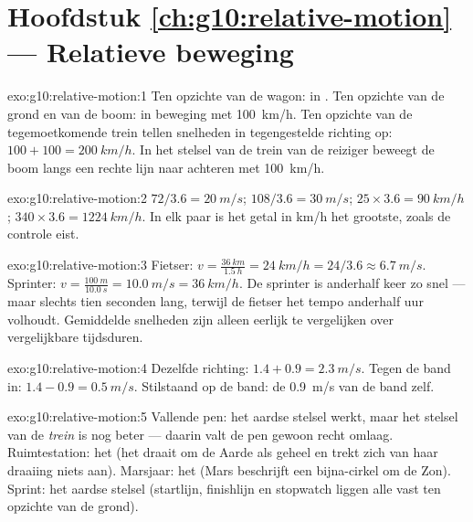 \section*{Hoofdstuk \ref{ch:g10:relative-motion} --- Relatieve beweging}

\begin{solution}{exo:g10:relative-motion:1}
Ten opzichte van de wagon: in . Ten opzichte van de grond en van de
boom: in beweging met \qty{100}{km/h}. Ten opzichte van de
tegemoetkomende trein tellen snelheden in tegengestelde richting op:
$100 + 100 = \qty{200}{km/h}$. In het stelsel van de trein van de
reiziger beweegt de boom langs een rechte lijn naar achteren met
\qty{100}{km/h}.
\end{solution}

\begin{solution}{exo:g10:relative-motion:2}
$72 / 3.6 = \qty{20}{m/s}$; $108 / 3.6 = \qty{30}{m/s}$;
$25 \times 3.6 = \qty{90}{km/h}$; $340 \times 3.6 = \qty{1224}{km/h}$.
In elk paar is het getal in \unit{km/h} het grootste, zoals de controle
eist.
\end{solution}

\begin{solution}{exo:g10:relative-motion:3}
Fietser: $v = \frac{\qty{36}{km}}{\qty{1.5}{h}} = \qty{24}{km/h}
= 24/3.6 \approx \qty{6.7}{m/s}$. Sprinter:
$v = \frac{\qty{100}{m}}{\qty{10.0}{s}} = \qty{10.0}{m/s}
= \qty{36}{km/h}$. De sprinter is anderhalf keer zo snel --- maar
slechts tien seconden lang, terwijl de fietser het tempo anderhalf uur
volhoudt. Gemiddelde snelheden zijn alleen eerlijk te vergelijken over
vergelijkbare tijdsduren.
\end{solution}

\begin{solution}{exo:g10:relative-motion:4}
Dezelfde richting: $1.4 + 0.9 = \qty{2.3}{m/s}$. Tegen de band in:
$1.4 - 0.9 = \qty{0.5}{m/s}$. Stilstaand op de band: de \qty{0.9}{m/s}
van de band zelf.
\end{solution}

\begin{solution}{exo:g10:relative-motion:5}
Vallende pen: het aardse stelsel werkt, maar het stelsel van de
\emph{trein} is nog beter --- daarin valt de pen gewoon recht omlaag.
Ruimtestation: het  (het draait om de Aarde als
geheel en trekt zich van haar draaiing niets aan). Marsjaar: het
 (Mars beschrijft een bijna-cirkel om de Zon).
Sprint: het aardse stelsel (startlijn, finishlijn en stopwatch liggen
alle vast ten opzichte van de grond).
\end{solution}

